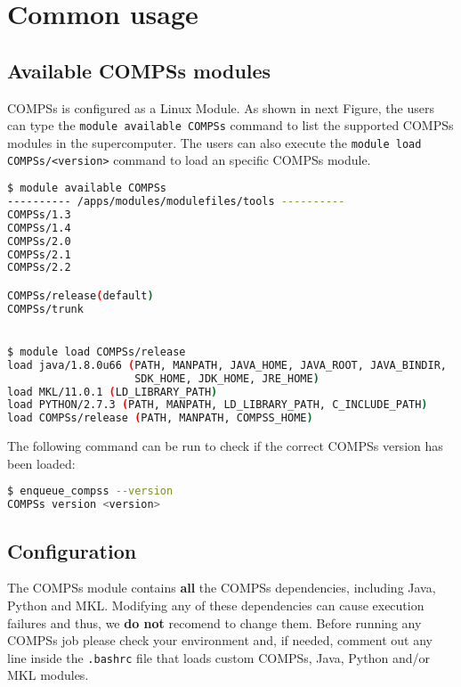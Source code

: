\section{Common usage}
\label{sec:common_usage}


\subsection{Available COMPSs modules}

COMPSs is configured as a Linux Module. As shown in next Figure, the users can type the \verb|module available COMPSs| command to list 
the supported COMPSs modules in the supercomputer. The users can also execute the \verb|module load COMPSs/<version>| command to load an
specific COMPSs module.

\begin{lstlisting}[language=bash]
$ module available COMPSs
---------- /apps/modules/modulefiles/tools ----------
COMPSs/1.3
COMPSs/1.4
COMPSs/2.0
COMPSs/2.1
COMPSs/2.2

COMPSs/release(default)
COMPSs/trunk


$ module load COMPSs/release
load java/1.8.0u66 (PATH, MANPATH, JAVA_HOME, JAVA_ROOT, JAVA_BINDIR,
                    SDK_HOME, JDK_HOME, JRE_HOME)
load MKL/11.0.1 (LD_LIBRARY_PATH)
load PYTHON/2.7.3 (PATH, MANPATH, LD_LIBRARY_PATH, C_INCLUDE_PATH)
load COMPSs/release (PATH, MANPATH, COMPSS_HOME)
\end{lstlisting}

The following command can be run to check if the correct COMPSs version has been loaded:

\begin{lstlisting}[language=bash]
$ enqueue_compss --version
COMPSs version <version>

\end{lstlisting}


\subsection{Configuration}

The COMPSs module contains \textbf{all} the COMPSs dependencies, including Java, Python and MKL. Modifying any of these dependencies
can cause execution failures and thus, we \textbf{do not} recomend to change them. Before running any COMPSs job please check your 
environment and, if needed, comment out any line inside the \verb|.bashrc| file that loads custom COMPSs, Java, Python and/or MKL
modules.

